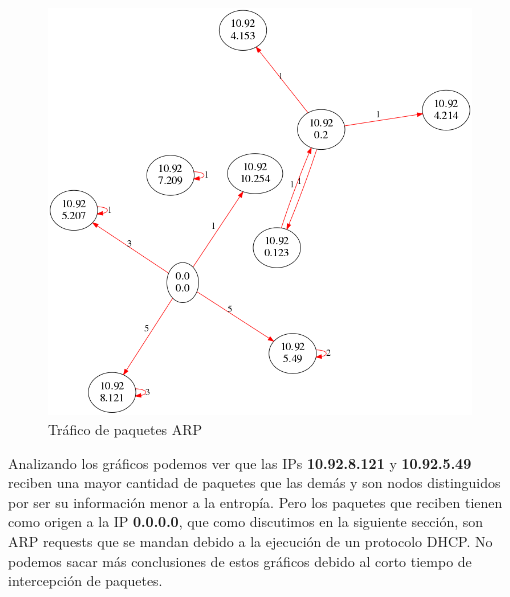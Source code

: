 \begin{figure}[H]
       \centering
       \includegraphics[width=1\textwidth]{../resultados/subte/network.png}
       \caption{Tráfico de paquetes ARP}
       \label{red-Starbucks-dst-information}
\end{figure}

Analizando los gráficos podemos ver que las IPs \textbf{10.92.8.121} y \textbf{10.92.5.49} reciben una mayor cantidad de paquetes que las demás y son nodos distinguidos por ser su información menor a la entropía. Pero los paquetes que reciben tienen como origen a la IP \textbf{0.0.0.0}, que como discutimos en la siguiente sección, son ARP requests que se mandan debido a la ejecución de un protocolo DHCP. No podemos sacar más conclusiones de estos gráficos debido al corto tiempo de intercepción de paquetes.\\

